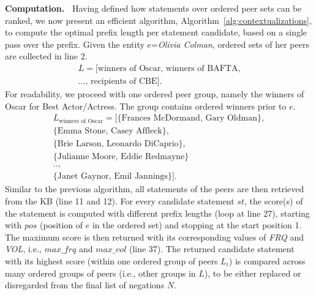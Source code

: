 \noindent
\textbf{Computation.\ }
Having defined how statements over ordered peer sets can be ranked, we now present an efficient algorithm, Algorithm~\ref{alg:contextualizations}, to compute the optimal prefix length per statement candidate, based on a single pass over the prefix. Given the entity $e$=\textit{Olivia Colman}, ordered sets of her peers are collected in line 2.
\begin{equation*}
\begin{split}
L = [\text{winners of Oscar, winners of BAFTA,}\\ \text{..., recipients of CBE}].
\end{split}
\end{equation*}
For readability, we proceed with one ordered peer group, namely the winners of Oscar for Best Actor/Actress. The group contains ordered winners prior to $e$.
\begin{equation*}
\begin{split}
L_\text{winners of Oscar} = [\{\text{Frances McDormand, Gary Oldman}\},\\ \{\text{Emma Stone, Casey Affleck}\},\\ \{\text{Brie Larson, Leonardo DiCaprio}\},\\ \{\text{Julianne Moore, Eddie Redmayne}\}\\ \text{..,}\\ \{\text{Janet Gaynor, Emil Jannings}\}].
\end{split}
\end{equation*}
Similar to the previous algorithm, all statements of the peers are then retrieved from the KB (line 11 and 12). For every candidate statement $st$, the score(s) of the statement is computed with different prefix lengths (loop at line 27), starting with $pos$ (position of $e$ in the ordered set) and stopping at the start position 1. The maximum score is then returned with its corresponding values of \textit{FRQ} and \textit{VOL}, i.e., $max\_\mathit{frq}$ and $max\_\mathit{vol}$ (line 37). The returned candidate statement with its highest score (within one ordered group of peers $L_i$) is compared across many ordered groups of peers (i.e., other groups in $L$), to be either replaced or disregarded from the final list of negations $N$.


